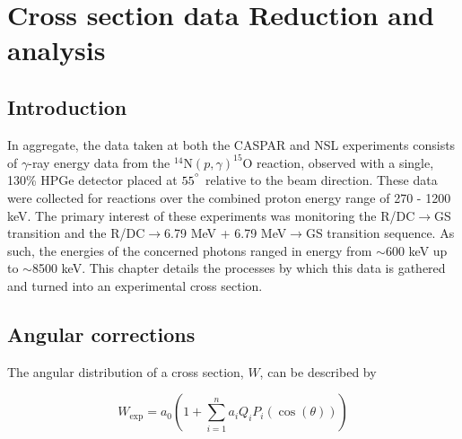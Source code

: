 %
%
%
%
%
%
%
%
%
%

%
%

\chapter{Cross section data Reduction and analysis}
\label{chap: data}

\section{Introduction}

In aggregate, the data taken at both the CASPAR and NSL experiments consists of $\gamma$-ray energy data from the $^{14}$N$\left( p,\gamma \right) ^{15}$O reaction, observed with a single, 130\% HPGe detector placed at $55^{\degree}$ relative to the beam direction. These data were collected for reactions over the combined proton energy range of 270 - 1200 keV. The primary interest of these experiments was monitoring the R/DC$\rightarrow$GS transition and the R/DC$\rightarrow$6.79 MeV + 6.79 MeV$\rightarrow$GS transition sequence. As such, the energies of the concerned photons ranged in energy from $\sim$600 keV up to $\sim$8500 keV. This chapter details the processes by which this data is gathered and turned into an experimental cross section.

\section{Angular corrections}
\label{sec: angularCorrections}

The angular distribution of a cross section, $W$, can be described by

\begin{equation}
W_{\text{exp}} = a_{0} \left(1 + \sum_{i = 1}^{n} a_{i} Q_{i} P_{i} ( \cos (\theta) )    \right)
\end{equation}


